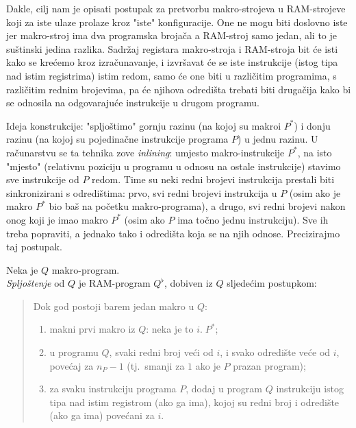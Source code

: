 Dakle, cilj nam je opisati postupak za pretvorbu makro-strojeva u RAM-strojeve koji za iste ulaze prolaze kroz "iste" konfiguracije. One ne mogu biti doslovno iste jer makro-stroj ima dva programska brojača a RAM-stroj samo jedan, ali to je suštinski jedina razlika. Sadržaj registara makro-stroja i RAM-stroja bit će isti kako se krećemo kroz izračunavanje, i izvršavat će se iste instrukcije (istog tipa nad istim registrima) istim redom, samo će one biti u različitim programima, s različitim rednim brojevima, pa će njihova odredišta trebati biti drugačija kako bi se odnosila na odgovarajuće instrukcije u drugom programu.

Ideja konstrukcije: "spljoštimo" gornju razinu (na kojoj su makroi $P^*$) i donju razinu (na kojoj su pojedinačne instrukcije programa $P$) u jednu razinu. U računarstvu se ta tehnika zove \emph{inlining}: umjesto makro-instrukcije $P^*$\!, na isto "mjesto" (relativnu poziciju u programu u odnosu na ostale instrukcije) stavimo sve instrukcije od $P$ redom. Time su neki redni brojevi instrukcija prestali biti sinkronizirani s odredištima: prvo, svi redni brojevi instrukcija u $P$ (osim ako je makro $P^*$ bio baš na početku makro-programa), a drugo, svi redni brojevi nakon onog koji je imao makro $P^*$ (osim ako $P$ ima točno jednu instrukciju). Sve ih treba popraviti, a jednako tako i odredišta koja se na njih odnose. Precizirajmo taj postupak.

\begin{definicija}[{name=[spljoštenje]}]\label{def:flat}
Neka je $Q$ makro-program.\\ \emph{Spljoštenje} od $Q$ je RAM-program $Q^\flat$, dobiven iz $Q$ sljedećim postupkom:
\begin{quotation}
Dok god postoji barem jedan makro u $Q$:
\begin{enumerate}
    \item\label{korak:makni} makni prvi makro iz $Q$: neka je to $i.\;P^*$;
    \item\label{korak:renumeriraj} u programu $Q$, svaki redni broj veći od $i$, i svako odredište veće od $i$, povećaj za $n_P-1$ (tj.\ smanji za $1$ ako je $P$ prazan program);
    \item\label{korak:dodaj} za svaku instrukciju programa $P$, dodaj u program $Q$ instrukciju istog tipa nad istim registrom (ako ga ima), kojoj su redni broj i odredište (ako ga ima) povećani za $i$.\qedhere
\end{enumerate}
\end{quotation}
\end{definicija}

